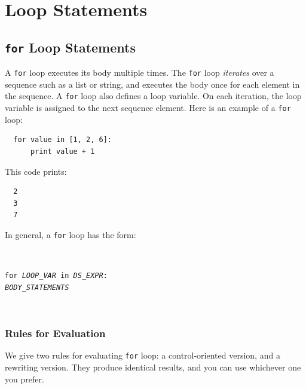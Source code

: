 \documentclass{article}
\newcommand{\expr}[1]{\texttt{#1}}
\newcommand{\kw}[1]{\expr{#1}}
\newcommand{\mvar}[1]{\expr{\emph{\uppercase{#1}}}}
\newcommand{\pretabularspace}{\ifhevea\else \strut \\ \strut \fi}
\newcommand{\posttabularspace}{\ifhevea\else \strut \\ \strut \fi}
\begin{document}
% 
% 
% 


\section{Loop Statements}
\label{sec:loop-statements}
\subsection{\kw{for} Loop Statements}

A \kw{for} loop executes its body multiple times.  The \kw{for} loop
\emph{iterates} over a sequence such as a list or string, and executes the
body once for each element in the sequence.
A \kw{for} loop also defines a loop variable.  On each
iteration, the loop variable is assigned to the next sequence element.
Here is an example of a \kw{for} loop:

\begin{verbatim}
  for value in [1, 2, 6]:
      print value + 1
\end{verbatim}

  This code prints:
\begin{verbatim}
  2
  3
  7
\end{verbatim}

  In general, a \kw{for} loop has the form:

  \pretabularspace
  \noindent \expr{for \mvar{LOOP\_VAR} in \mvar{DS\_EXPR}:} \\
  \indent \mvar{BODY\_STATEMENTS}
  \posttabularspace

\subsubsection{Rules for Evaluation}
\label{sec:loop-evaluation-rules}

We give two rules for evaluating \kw{for} loop:  a control-oriented
version, and a rewriting version.  They produce identical results, and you
can use whichever one you prefer.
\end{document}
